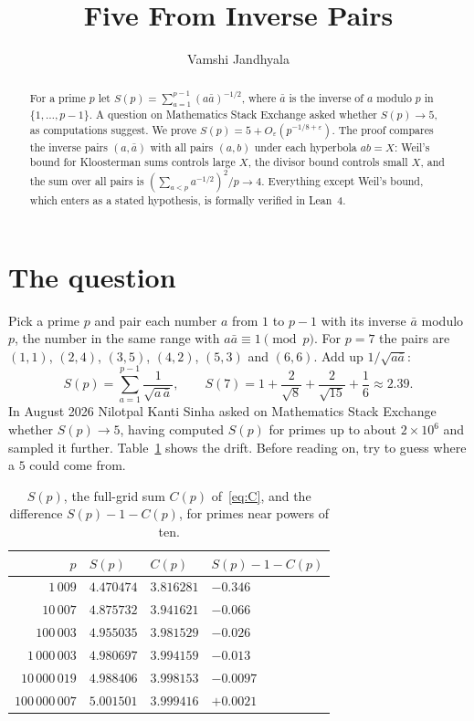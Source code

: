 \documentclass[11pt]{amsart}
\title{Five From Inverse Pairs}
\author{Vamshi Jandhyala}
\theoremstyle{remark}
\begin{document}
\begin{abstract}
For a prime $p$ let $S(p)=\sum_{a=1}^{p-1}(a\bar a)^{-1/2}$, where $\bar a$ is the inverse of $a$ modulo $p$ in $\{1,\dots,p-1\}$. A question on Mathematics Stack Exchange asked whether $S(p)\to5$, as computations suggest. We prove $S(p)=5+O_\varepsilon(p^{-1/8+\varepsilon})$. The proof compares the inverse pairs $(a,\bar a)$ with all pairs $(a,b)$ under each hyperbola $ab=X$: Weil's bound for Kloosterman sums controls large $X$, the divisor bound controls small $X$, and the sum over all pairs is $(\sum_{a<p}a^{-1/2})^2/p\to4$. Everything except Weil's bound, which enters as a stated hypothesis, is formally verified in Lean~4.
\end{abstract}

\maketitle

\section{The question}

Pick a prime $p$ and pair each number $a$ from $1$ to $p-1$ with its inverse $\bar a$ modulo $p$, the number in the same range with $a\bar a\equiv1\pmod p$. For $p=7$ the pairs are $(1,1)$, $(2,4)$, $(3,5)$, $(4,2)$, $(5,3)$ and $(6,6)$. Add up $1/\sqrt{a\bar a}$:
\[
S(p)=\sum_{a=1}^{p-1}\frac1{\sqrt{a\,\bar a}},\qquad S(7)=1+\frac2{\sqrt8}+\frac2{\sqrt{15}}+\frac16\approx2.39 .
\]
In August 2026 Nilotpal Kanti Sinha asked on Mathematics Stack Exchange~\cite{MSE} whether $S(p)\to5$, having computed $S(p)$ for primes up to about $2\times10^6$ and sampled it further. Table~\ref{tab:Sp} shows the drift. Before reading on, try to guess where a $5$ could come from.

\begin{table}[ht]
\centering
\begin{tabular}{rlll}
\toprule
$p$ & $S(p)$ & $C(p)$ & $S(p)-1-C(p)$\\
\midrule
$1\,009$ & $4.470474$ & $3.816281$ & $-0.346$\\
$10\,007$ & $4.875732$ & $3.941621$ & $-0.066$\\
$100\,003$ & $4.955035$ & $3.981529$ & $-0.026$\\
$1\,000\,003$ & $4.980697$ & $3.994159$ & $-0.013$\\
$10\,000\,019$ & $4.988406$ & $3.998153$ & $-0.0097$\\
$100\,000\,007$ & $5.001501$ & $3.999416$ & $+0.0021$\\
\bottomrule
\end{tabular}
\caption{$S(p)$, the full-grid sum $C(p)$ of~\eqref{eq:C}, and the difference $S(p)-1-C(p)$, for primes near powers of ten.}
\label{tab:Sp}
\end{table}
\end{document}
